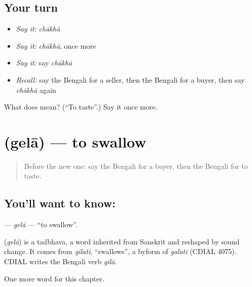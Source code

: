 \subsection*{Your turn}
\begin{itemize}
\raggedright
  \item \emph{Say it:} \emph{chākhā}
  \item \emph{Say it:} \emph{chākhā}, once more
  \item \emph{Say it:} say \emph{chākhā}
  \item \emph{Recall:} say the Bengali for a seller, then the Bengali for a buyer, then say \emph{chākhā} again
\end{itemize}

\begin{tcolorbox}[breakable,colback=teal!4,colframe=teal!35!black,title={Before you move on}]
What does  mean? (\textquotedblleft{}To taste\textquotedblright{}.) Say it once more.
\end{tcolorbox}
\section[\texorpdfstring{\bn{গেলা} (gelā)}{গেলা (gelā)}]{ (gelā) — to swallow}

\label{lesson:BN-C179-gela}



\begin{quote}
Before the new one: say the Bengali for a buyer, then the Bengali for to taste.
\end{quote}

\subsection*{You'll want to know: }
\textbf{} — \emph{gelā} — \textquotedblleft{}to swallow\textquotedblright{}.

\begin{cousinweb}
\textbf{} (\emph{gelā}) is a tadbhava, a word inherited from Sanskrit and reshaped by sound change. It comes from \emph{gilati}, \textquotedblleft{}swallows\textquotedblright{}, a byform of \emph{galati} (CDIAL 4075). CDIAL writes the Bengali verb \emph{gilā}.
\end{cousinweb}

\begin{grammarlens}[title={What you've built}]
One more word for this chapter.
\end{grammarlens}

